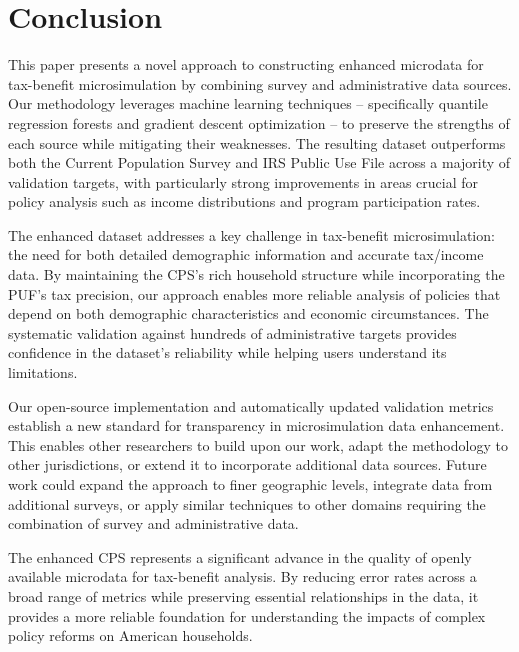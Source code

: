 \section{Conclusion}

This paper presents a novel approach to constructing enhanced microdata for tax-benefit microsimulation by combining survey and administrative data sources. Our methodology leverages machine learning techniques – specifically quantile regression forests and gradient descent optimization – to preserve the strengths of each source while mitigating their weaknesses. The resulting dataset outperforms both the Current Population Survey and IRS Public Use File across a majority of validation targets, with particularly strong improvements in areas crucial for policy analysis such as income distributions and program participation rates.

The enhanced dataset addresses a key challenge in tax-benefit microsimulation: the need for both detailed demographic information and accurate tax/income data. By maintaining the CPS's rich household structure while incorporating the PUF's tax precision, our approach enables more reliable analysis of policies that depend on both demographic characteristics and economic circumstances. The systematic validation against hundreds of administrative targets provides confidence in the dataset's reliability while helping users understand its limitations.

Our open-source implementation and automatically updated validation metrics establish a new standard for transparency in microsimulation data enhancement. This enables other researchers to build upon our work, adapt the methodology to other jurisdictions, or extend it to incorporate additional data sources. Future work could expand the approach to finer geographic levels, integrate data from additional surveys, or apply similar techniques to other domains requiring the combination of survey and administrative data.

The enhanced CPS represents a significant advance in the quality of openly available microdata for tax-benefit analysis. By reducing error rates across a broad range of metrics while preserving essential relationships in the data, it provides a more reliable foundation for understanding the impacts of complex policy reforms on American households.